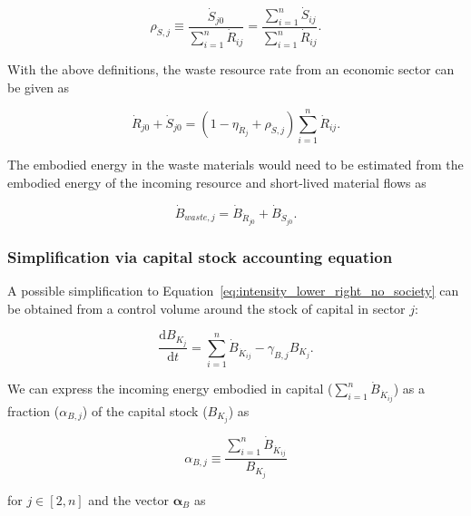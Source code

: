 \begin{equation}
	\rho_{\dot{S},j}
	\equiv \frac{\dot{S}_{j0}}{\sum\limits_{i=1}^{n} \dot{R}_{ij}}
	= \frac{\sum\limits_{i=1}^{n} \dot{S}_{ij}}{\sum\limits_{i=1}^{n} \dot{R}_{ij}}.
\end{equation} 

With the above definitions, the waste resource rate from an economic sector
can be given as

\begin{equation}
	\dot{R}_{j0} + \dot{S}_{j0}
	= (1 - \eta_{\dot{R}_{j}} + \rho_{\dot{S},j}) \sum\limits_{i=1}^{n} \dot{R}_{ij}.
\end{equation}

\noindent{}The embodied energy in the waste materials would need to be estimated
from the embodied energy of the incoming resource and short-lived material flows as

\begin{equation}
	\dot{B}_{waste,j}
	= \dot{B}_{\dot{R}_{j0}} + \dot{B}_{\dot{S}_{j0}}.
\end{equation}


\subsubsection{Simplification via capital stock accounting equation}
\label{sec:capital_accounting}

A possible simplification to Equation~\ref{eq:intensity_lower_right_no_society}
can be obtained from a control volume around the stock of capital in sector $j$:

\begin{equation}
	\frac{\mathrm{d}B_{K_{j}}}{\mathrm{d}t}
	= \sum\limits_{i=1}^{n} \dot{B}_{\dot{K}_{ij}} 
	- \gamma_{B,j} B_{K_{j}}.
\end{equation}

We can express the incoming energy embodied in capital ($\sum_{i=1}^{n} \dot{B}_{\dot{K}_{ij}}$)
as a fraction ($\alpha_{B,j}$) of the capital stock ($B_{K_{j}}$) as

\begin{equation}
	\alpha_{B,j}
	\equiv 
	\frac{\sum\limits_{i=1}^{n} \dot{B}_{\dot{K}_{ij}}} {B_{K_{j}}}
\end{equation}

\noindent{}for $j \in [2,n]$ and the vector $\boldsymbol{\alpha}_{B}$ as

